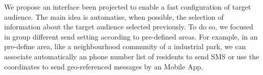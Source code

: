 We propose an interface been projected to enable a fast configuration of target audience. The main idea is automatise, when possible, the selection of information about the target audience selected previously. To do so, we focused in group different send setting according to pre-defined areas. For example, in an pre-define area, like a neighbourhood community of a industrial park, we can associate automatically an phone number list of residents to send SMS or use the coordinates to send geo-referenced messages by an Mobile App. %